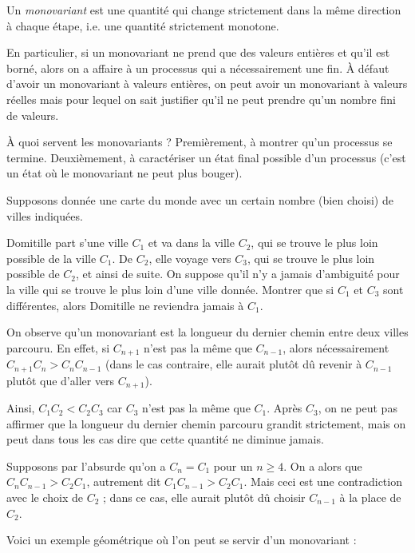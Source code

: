 Un \emph{monovariant} est une quantité qui change strictement dans la même direction à chaque étape, i.e. une quantité strictement monotone.

En particulier, si un monovariant ne prend que des valeurs entières et qu'il est borné, alors on a affaire à un processus qui a nécessairement une fin. À défaut d'avoir un monovariant à valeurs entières, on peut avoir un monovariant à valeurs réelles mais pour lequel on sait justifier qu'il ne peut prendre qu'un nombre fini de valeurs.

À quoi servent les monovariants ? Premièrement, à montrer qu'un processus se termine. Deuxièmement, à caractériser un état final possible d'un processus (c'est un état où le monovariant ne peut plus bouger).


\begin{exo}
Supposons donnée une carte du monde avec un certain nombre (bien choisi) de villes indiquées.

Domitille part s'une ville $C_1$ et va dans la ville $C_2$, qui se trouve le plus loin possible de la ville $C_1$. De $C_2$, elle voyage vers $C_3$, qui se trouve le plus loin possible de $C_2$, et ainsi de suite. On suppose qu'il n'y a jamais d'ambiguité pour la ville qui se trouve le plus loin d'une ville donnée. Montrer que si $C_1$ et $C_3$ sont différentes, alors Domitille ne reviendra jamais à $C_1$.
\end{exo}

\begin{sol}
On observe qu'un monovariant est la longueur du dernier chemin entre deux villes parcouru. En effet, si $C_{n + 1}$ n'est pas la même que $C_{n - 1}$, alors nécessairement $C_{n + 1}C_n > C_nC_{n - 1}$ (dans le cas contraire, elle aurait plutôt dû revenir à $C_{n - 1}$ plutôt que d'aller vers $C_{n + 1}$).

Ainsi, $C_1C_2 < C_2C_3$ car $C_3$ n'est pas la même que $C_1$. Après $C_3$, on ne peut pas affirmer que la longueur du dernier chemin parcouru grandit strictement, mais on peut dans tous les cas dire que cette quantité ne diminue jamais.

Supposons par l'absurde qu'on a $C_n = C_1$ pour un $n \ge 4$. On a alors que $C_nC_{n - 1} > C_2C_1$, autrement dit $C_1C_{n - 1} > C_2C_1$. Mais ceci est une contradiction avec le choix de $C_2$ ; dans ce cas, elle aurait plutôt dû choisir $C_{n - 1}$ à la place de $C_2$.
\end{sol}


Voici un exemple géométrique où l'on peut se servir d'un monovariant :

